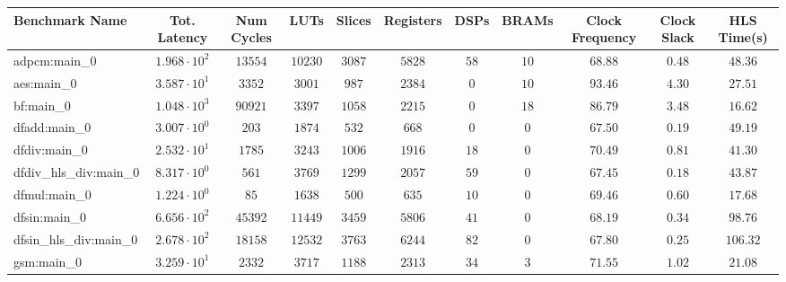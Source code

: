 \begin{tabular}{|l|c|c|c|c|c|c|c|c|c|c|}
\hline
Benchmark Name          & Tot. Latency           & Num Cycles & LUTs      & Slices    & Registers & DSPs    & BRAMs   & Clock Frequency & Clock Slack & HLS Time(s) \\
\hline
adpcm:main\_0           & $ 1.968 \cdot 10^{2} $ & $ 13554  $ & $ 10230 $ & $ 3087  $ & $ 5828  $ & $ 58  $ & $ 10  $ & $ 68.88       $ & $ 0.48    $ & $ 48.36   $ \\
aes:main\_0             & $ 3.587 \cdot 10^{1} $ & $ 3352   $ & $ 3001  $ & $ 987   $ & $ 2384  $ & $ 0   $ & $ 10  $ & $ 93.46       $ & $ 4.30    $ & $ 27.51   $ \\
bf:main\_0              & $ 1.048 \cdot 10^{3} $ & $ 90921  $ & $ 3397  $ & $ 1058  $ & $ 2215  $ & $ 0   $ & $ 18  $ & $ 86.79       $ & $ 3.48    $ & $ 16.62   $ \\
dfadd:main\_0           & $ 3.007 \cdot 10^{0} $ & $ 203    $ & $ 1874  $ & $ 532   $ & $ 668   $ & $ 0   $ & $ 0   $ & $ 67.50       $ & $ 0.19    $ & $ 49.19   $ \\
dfdiv:main\_0           & $ 2.532 \cdot 10^{1} $ & $ 1785   $ & $ 3243  $ & $ 1006  $ & $ 1916  $ & $ 18  $ & $ 0   $ & $ 70.49       $ & $ 0.81    $ & $ 41.30   $ \\
dfdiv\_hls\_div:main\_0 & $ 8.317 \cdot 10^{0} $ & $ 561    $ & $ 3769  $ & $ 1299  $ & $ 2057  $ & $ 59  $ & $ 0   $ & $ 67.45       $ & $ 0.18    $ & $ 43.87   $ \\
dfmul:main\_0           & $ 1.224 \cdot 10^{0} $ & $ 85     $ & $ 1638  $ & $ 500   $ & $ 635   $ & $ 10  $ & $ 0   $ & $ 69.46       $ & $ 0.60    $ & $ 17.68   $ \\
dfsin:main\_0           & $ 6.656 \cdot 10^{2} $ & $ 45392  $ & $ 11449 $ & $ 3459  $ & $ 5806  $ & $ 41  $ & $ 0   $ & $ 68.19       $ & $ 0.34    $ & $ 98.76   $ \\
dfsin\_hls\_div:main\_0 & $ 2.678 \cdot 10^{2} $ & $ 18158  $ & $ 12532 $ & $ 3763  $ & $ 6244  $ & $ 82  $ & $ 0   $ & $ 67.80       $ & $ 0.25    $ & $ 106.32  $ \\
gsm:main\_0             & $ 3.259 \cdot 10^{1} $ & $ 2332   $ & $ 3717  $ & $ 1188  $ & $ 2313  $ & $ 34  $ & $ 3   $ & $ 71.55       $ & $ 1.02    $ & $ 21.08   $ \\

\end{tabular}
